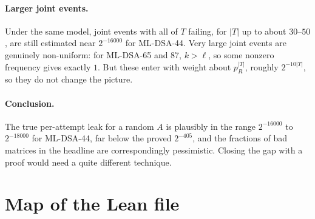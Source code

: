 \documentclass[11pt]{article}
\theoremstyle{definition}
\theoremstyle{remark}
\begin{document}
\paragraph{Larger joint events.}
Under the same model, joint events with all of $T$ failing, for $|T|$ up to about $30$--$50$,
are still estimated near $2^{-16000}$ for
ML-DSA-44. Very large joint events are genuinely non-uniform: for ML-DSA-65 and 87, $k>\ell$, so
some nonzero frequency gives exactly $1$. But these enter with weight about $p_R^{|T|}$, roughly
$2^{-10|T|}$, so they do not change the picture.

\paragraph{Conclusion.}
The true per-attempt leak for a random $A$ is plausibly in the range $2^{-16000}$ to
$2^{-18000}$ for ML-DSA-44, far below the proved $2^{-405}$, and the fractions of bad matrices
in the headline are correspondingly pessimistic. Closing the gap with a proof would need a quite
different technique.

\section{Map of the Lean file}
\end{document}
